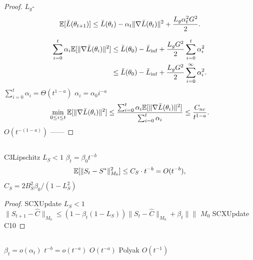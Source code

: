 \begin{proof}
 $L_g$-
\begin{equation}
    \mathbb{E}[\bar{L}(\theta_{t+1})] \leq \bar{L}(\theta_t) - \alpha_t \|\nabla \bar{L}(\theta_t)\|^2 + \frac{L_g \alpha_t^2 G^2}{2}.
\end{equation}

\begin{align}
    \sum_{i=0}^t \alpha_i \mathbb{E}[\|\nabla \bar{L}(\theta_i)\|^2] &\leq \bar{L}(\theta_0) - \bar{L}_{\inf} + \frac{L_g G^2}{2} \sum_{i=0}^t \alpha_i^2 \\
    &\leq \bar{L}(\theta_0) - \bar{L}_{\inf} + \frac{L_g G^2}{2} \sum_{i=0}^\infty \alpha_i^2.
\end{align}
 $\sum_{i=0}^t \alpha_i = \Theta(t^{1-a})$  $\alpha_i = \alpha_0 i^{-a}$
\begin{equation}
    \min_{0 \leq i \leq t} \mathbb{E}[\|\nabla \bar{L}(\theta_i)\|^2] \leq \frac{\sum_{i=0}^t \alpha_i \mathbb{E}[\|\nabla \bar{L}(\theta_i)\|^2]}{\sum_{i=0}^t \alpha_i} \leq \frac{C_{nc}}{t^{1-a}}.
\end{equation}
 $O(t^{-(1-a)})$ ——\textit{}
\end{proof}

\subsection{}

\begin{theorem}[]\label{thm:rate-gatekeeper}
 C3Lipschitz $L_S < 1$ $\beta_t = \beta_0 t^{-b}$
\begin{equation}
    \mathbb{E}[\|S_t - S^*\|_{M_0}^2] \leq C_S \cdot t^{-b} = O(t^{-b}),
\end{equation}
 $C_S = 2 B_S^2 \beta_0 / (1 - L_S^2)$
\end{theorem}

\begin{proof}
 SCXUpdate $L_S < 1$$\|S_{t+1} - \hat{C}\|_{M_0} \leq (1 - \beta_t(1 - L_S)) \|S_t - \hat{C}\|_{M_0} + \beta_t \|\|$ $M_0$  SCXUpdate C10
\end{proof}

\subsection{}

 $\beta_t = o(\alpha_t)$ $t^{-b} = o(t^{-a})$ $O(t^{-a})$ Polyak  $O(t^{-1})$ 

\subsection{}

